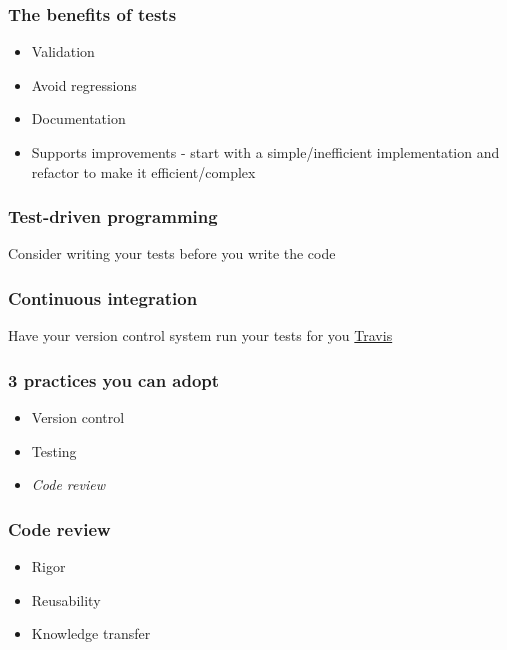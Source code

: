 \documentclass{beamer}
\begin{document}
\begin{frame}
\frametitle{The benefits of tests}
\begin{itemize}
\pause
\item
Validation
\pause
\item
Avoid regressions
\pause
\item
Documentation
\pause
\item
Supports improvements - start with a simple/inefficient implementation and refactor
to make it efficient/complex
\end{itemize}
\end{frame}


\begin{frame}
\frametitle{Test-driven programming}
Consider writing your tests before you write the code
\end{frame}


\begin{frame}
\frametitle{Continuous integration}
Have your version control system run your tests for you
\href{https://travis-ci.org}{Travis}
\end{frame}

\begin{frame}
\frametitle{3 practices you can adopt}
\begin{itemize}
\item
Version control
\item
Testing
\item
\emph{Code review}
\end{itemize}
\end{frame}



\begin{frame}
\frametitle{Code review
  \footnotemark[1] \footnotemark[2]}
\begin{itemize}
\pause
\item
Rigor
\pause
\item
Reusability
\pause
\item
Knowledge transfer
\end{itemize}
\end{frame}
\end{document}
